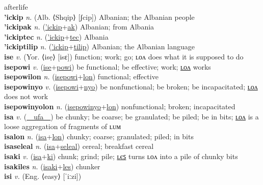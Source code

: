 afterlife \label{icipetalwel} \\
\textbf{'ickip} \textit{n.} (Alb. ⟨Shqip⟩ [ʃcip])
Albanian; the Albanian people \label{'ickip} \\
\textbf{'ickipak} \textit{n.} (\hyperref['ickip]{'ickip}+\hyperref[ak]{ak})
Albanian; from Albania \label{'ickipak} \\
\textbf{'ickiptec} \textit{n.} (\hyperref['ickip]{'ickip}+\hyperref[tec]{tec})
Albania \label{'ickiptec} \\
\textbf{'ickiptilip} \textit{n.} (\hyperref['ickip]{'ickip}+\hyperref[tilip]{tilip})
Albanian; the Albanian language \label{'ickiptilip} \\
\textbf{ise} \textit{v.} (Yor. ⟨isẹ⟩ [isɛ])
function; work; go; ʟᴏᴧ does what it is supposed to do \label{ise} \\
\textbf{isepowi} \textit{v.} (\hyperref[ise]{ise}+\hyperref[powi]{powi})
be functional; be effective; work; \hyperref[isepowilon]{ʟᴏᴧ} works \label{isepowi} \\
\textbf{isepowilon} \textit{n.} (\hyperref[isepowi]{isepowi}+\hyperref[lon]{lon})
functional; effective \label{isepowilon} \\
\textbf{isepowinyo} \textit{v.} (\hyperref[isepowi]{isepowi}+\hyperref[nyo]{nyo})
be nonfunctional; be broken; be incapacitated; \hyperref[isepowinyolon]{ʟᴏᴧ} does not work \label{isepowinyo} \\
\textbf{isepowinyolon} \textit{n.} (\hyperref[isepowinyo]{isepowinyo}+\hyperref[lon]{lon})
nonfunctional; broken; incapacitated \label{isepowinyolon} \\
\textbf{isa} \textit{v.} (\hyperref[ufa]{~~ufa~~})
be chunky; be coarse; be granulated; be piled; be in bits; \hyperref[isalon]{ʟᴏᴧ} is a loose aggregation of fragments of ʟᴜᴍ \label{isa} \\
\textbf{isalon} \textit{n.} (\hyperref[isa]{isa}+\hyperref[lon]{lon})
chunky; coarse; granulated; piled; in bits \label{isalon} \\
\textbf{isaseleal} \textit{n.} (\hyperref[isa]{isa}+\hyperref[seleal]{seleal})
cereal; breakfast cereal \label{isaseleal} \\
\textbf{isaki} \textit{v.} (\hyperref[isa]{isa}+\hyperref[ki]{ki})
chunk; grind; pile; \hyperref[isakiles]{ʟєꜱ} turns ʟᴏᴧ into a pile of chunky bits \label{isaki} \\
\textbf{isakiles} \textit{n.} (\hyperref[isaki]{isaki}+\hyperref[les]{les})
chunker \label{isakiles} \\
\textbf{isi} \textit{v.} (Eng. ⟨easy⟩ [ˈiːzi])
